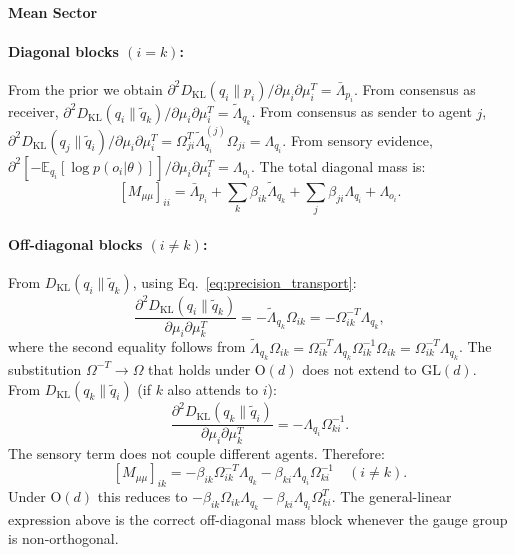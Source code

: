 \documentclass[11pt]{article}
\begin{document}
\paragraph{Mean Sector}

\paragraph{Diagonal blocks $(i = k)$:} From the prior we obtain $\partial^2 D_{\mathrm{KL}}(q_i \| p_i)/\partial \mu_i \partial \mu_i^T = \bar{\Lambda}_{p_i}$. From consensus as receiver, $\partial^2 D_{\mathrm{KL}}(q_i \| \tilde{q}_k)/\partial \mu_i \partial \mu_i^T = \tilde{\Lambda}_{q_k}$. From consensus as sender to agent $j$, $\partial^2 D_{\mathrm{KL}}(q_j \| \tilde{q}_i)/\partial \mu_i \partial \mu_i^T = \Omega_{ji}^T \tilde{\Lambda}_{q_i}^{(j)} \Omega_{ji} = \Lambda_{q_i}$. From sensory evidence, $\partial^2[-\mathbb{E}_{q_i}[\log p(o_i | \theta)]]/\partial \mu_i \partial \mu_i^T = \Lambda_{o_i}$. The total diagonal mass is:
\begin{equation}
\boxed{[M_{\mu\mu}]_{ii} = \bar{\Lambda}_{p_i} + \sum_k \beta_{ik} \tilde{\Lambda}_{q_k} + \sum_j \beta_{ji} \Lambda_{q_i} + \Lambda_{o_i}.}
\label{eq:mass_mu_diagonal}
\end{equation}

\paragraph{Off-diagonal blocks $(i \neq k)$:} From $D_{\mathrm{KL}}(q_i \| \tilde{q}_k)$, using Eq.~\eqref{eq:precision_transport}:
\begin{equation}
\frac{\partial^2 D_{\mathrm{KL}}(q_i \| \tilde{q}_k)}{\partial \mu_i \partial \mu_k^T} = -\tilde{\Lambda}_{q_k}\Omega_{ik} = -\Omega_{ik}^{-T}\Lambda_{q_k},
\end{equation}
where the second equality follows from $\tilde{\Lambda}_{q_k}\Omega_{ik} = \Omega_{ik}^{-T}\Lambda_{q_k}\Omega_{ik}^{-1}\Omega_{ik} = \Omega_{ik}^{-T}\Lambda_{q_k}$. The substitution $\Omega^{-T} \to \Omega$ that holds under $\mathrm{O}(d)$ does not extend to $\mathrm{GL}(d)$. From $D_{\mathrm{KL}}(q_k \| \tilde{q}_i)$ (if $k$ also attends to $i$):
\begin{equation}
\frac{\partial^2 D_{\mathrm{KL}}(q_k \| \tilde{q}_i)}{\partial \mu_i \partial \mu_k^T} = -\Lambda_{q_i}\Omega_{ki}^{-1}.
\end{equation}
The sensory term does not couple different agents. Therefore:
\begin{equation}
\boxed{[M_{\mu\mu}]_{ik} = -\beta_{ik}\Omega_{ik}^{-T}\Lambda_{q_k} - \beta_{ki}\Lambda_{q_i}\Omega_{ki}^{-1} \quad (i \neq k).}
\label{eq:mass_mu_offdiagonal}
\end{equation}
Under $\mathrm{O}(d)$ this reduces to $-\beta_{ik}\Omega_{ik}\Lambda_{q_k} - \beta_{ki}\Lambda_{q_i}\Omega_{ki}^T$. The general-linear expression above is the correct off-diagonal mass block whenever the gauge group is non-orthogonal.
\end{document}
